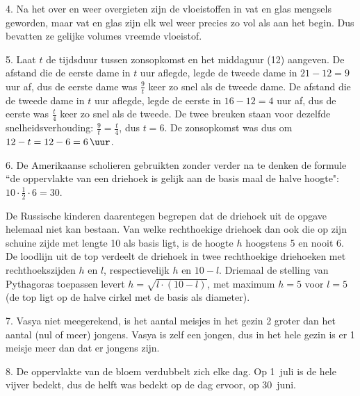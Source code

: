 \begin{problem}{4.}
    Na het over en weer overgieten zijn de vloeistoffen in vat en glas mengsels geworden, maar vat en glas zijn elk wel weer precies zo vol als aan het begin. Dus bevatten ze gelijke volumes vreemde vloeistof.
\end{problem}

\begin{problem}{5.}
    Laat $t$ de tijdsduur tussen zonsopkomst en het middaguur (\SI{12}{\uur}) aangeven. De afstand die de eerste dame in $t$ uur aflegde, legde de tweede dame in $21 - 12 = 9$ uur af, dus de eerste dame was $\frac{9}{t}$ keer zo snel als de tweede dame. De afstand die de tweede dame in $t$ uur aflegde, legde de eerste in $16 - 12 = 4$ uur af, dus de eerste was $\frac{t}{4}$ keer zo snel als de tweede. De twee breuken staan voor dezelfde snelheidsverhouding: $\frac{9}{t} = \frac{t}{4}$, dus $t = 6$. De zonsopkomst was dus om $12 - t = 12 - 6 = \SI{6}{\uur}$.
\end{problem}

\begin{problem}{6.}
    De Amerikaanse scholieren gebruikten zonder verder na te denken de formule ``de oppervlakte van een driehoek is gelijk aan de basis maal de halve hoogte": $10 \cdot \frac{1}{2} \cdot 6 = 30$.

    De Russische kinderen daarentegen begrepen dat de driehoek uit de opgave helemaal niet kan bestaan. Van welke rechthoekige driehoek dan ook die op zijn schuine zijde met lengte 10 als basis ligt, is de hoogte $h$ hoogstens 5 en nooit 6. De loodlijn uit de top verdeelt de driehoek in twee rechthoekige driehoeken met rechthoekszijden $h$ en $l$, respectievelijk $h$ en $10 - l$. Driemaal de stelling van Pythagoras toepassen levert $h = \sqrt{l \cdot (10 - l)}$, met maximum $h = 5$ voor $l = 5$ (de top ligt op de halve cirkel met de basis als diameter).
\end{problem}

\clearpage

\begin{problem}{7.}
    Vasya niet meegerekend, is het aantal meisjes in het gezin 2 groter dan het aantal (nul of meer) jongens. Vasya is zelf een jongen, dus in het hele gezin is er 1 meisje meer dan dat er jongens zijn.
\end{problem}

\begin{problem}{8.}
    De oppervlakte van de bloem verdubbelt zich elke dag. Op 1~juli is de hele vijver bedekt, dus de helft was bedekt op de dag ervoor, op 30~juni.
\end{problem}

